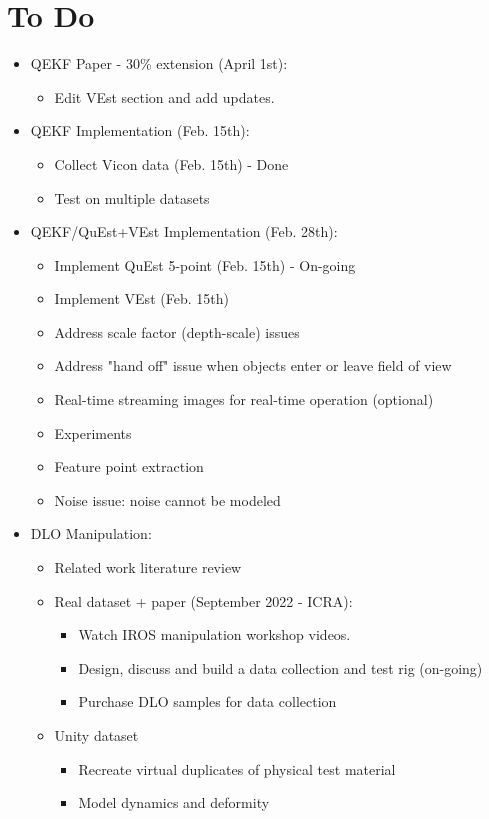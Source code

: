 \documentclass[11pt]{article}
\begin{document}
\section{To Do}
\begin{itemize}
  \item QEKF Paper - 30\% extension (April 1st):
  \begin{itemize}
      \item Edit VEst section and add updates.
  \end{itemize}
  \item QEKF Implementation (Feb. 15th):
  \begin{itemize}
      \item Collect Vicon data (Feb. 15th) - Done
      \item Test on multiple datasets
  \end{itemize}
  \item QEKF/QuEst+VEst Implementation (Feb. 28th):
  \begin{itemize}
      \item Implement QuEst 5-point (Feb. 15th) - On-going
      \item Implement VEst (Feb. 15th)
      \item Address scale factor (depth-scale) issues
      \item Address "hand off" issue when objects enter or leave field of view
      \item Real-time streaming images for real-time operation (optional)
      \item Experiments
      \item Feature point extraction
      \item Noise issue: noise cannot be modeled
  \end{itemize}
  \item  DLO Manipulation:
  \begin{itemize}
      \item Related work literature review
      \item Real dataset + paper (September 2022 - ICRA):
      \begin{itemize}
            \item Watch IROS manipulation workshop videos.
            \item Design, discuss and build a data collection and test rig (on-going)
            \item Purchase DLO samples for data collection
      \end{itemize}
      \item Unity dataset
      \begin{itemize}
            \item Recreate virtual duplicates of physical test material
            \item Model dynamics and deformity
      \end{itemize}
  \end{itemize}
\end{itemize}
\end{document}
